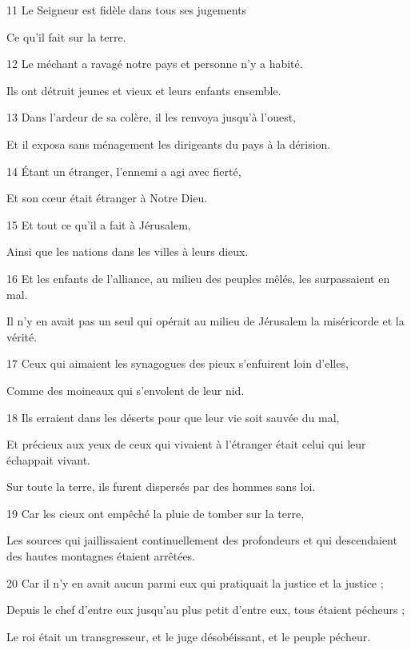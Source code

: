 \par 11 Le Seigneur est fidèle dans tous ses jugements
\par     Ce qu'il fait sur la terre.
\par   
\par 12 Le méchant a ravagé notre pays et personne n'y a habité.
\par     Ils ont détruit jeunes et vieux et leurs enfants ensemble.
\par 13 Dans l'ardeur de sa colère, il les renvoya jusqu'à l'ouest,
\par     Et il exposa sans ménagement les dirigeants du pays à la dérision.
\par 14 Étant un étranger, l'ennemi a agi avec fierté,
\par     Et son cœur était étranger à Notre Dieu.
\par 15 Et tout ce qu'il a fait à Jérusalem,
\par     Ainsi que les nations dans les villes à leurs dieux.
\par   
\par 16 Et les enfants de l'alliance, au milieu des peuples mêlés, les surpassaient en mal.
\par     Il n’y en avait pas un seul qui opérait au milieu de Jérusalem la miséricorde et la vérité.
\par 17 Ceux qui aimaient les synagogues des pieux s'enfuirent loin d'elles,
\par     Comme des moineaux qui s'envolent de leur nid.
\par 18 Ils erraient dans les déserts pour que leur vie soit sauvée du mal,
\par     Et précieux aux yeux de ceux qui vivaient à l’étranger était celui qui leur échappait vivant.
\par     Sur toute la terre, ils furent dispersés par des hommes sans loi.
\par 19 Car les cieux ont empêché la pluie de tomber sur la terre,
\par     Les sources qui jaillissaient continuellement des profondeurs et qui descendaient des hautes montagnes étaient arrêtées.
\par 20 Car il n'y en avait aucun parmi eux qui pratiquait la justice et la justice ;
\par     Depuis le chef d’entre eux jusqu’au plus petit d’entre eux, tous étaient pécheurs ;
\par     Le roi était un transgresseur, et le juge désobéissant, et le peuple pécheur.
